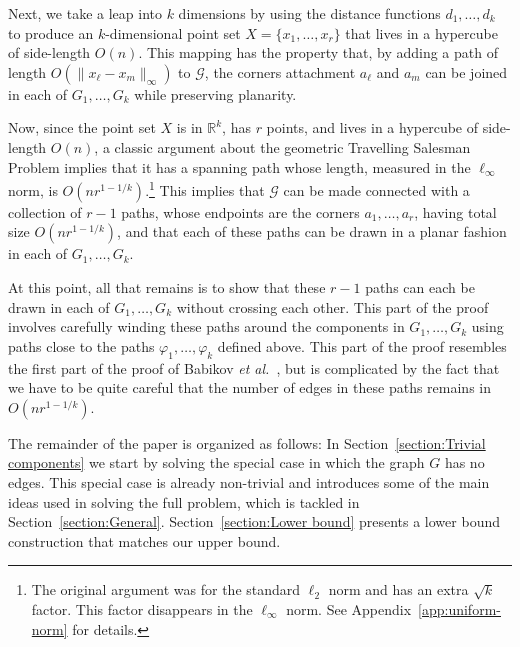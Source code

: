\documentclass[11pt]{patmorin}
\newcommand{\etal}{\emph{et al.}}
\newcommand{\R}{\mathbb{R}}
\begin{document}
Next, we take a leap into $k$ dimensions by using the distance
functions $d_1,\ldots,d_k$ to produce an $k$-dimensional point set
$X=\{x_1,\ldots,x_r\}$ that lives in a hypercube of side-length $O(n)$.
This mapping has the property that, by adding a path of length $O(\|x_\ell
-x_m\|_\infty)$ to $\mathcal G$, the corners attachment $a_\ell$ and $a_m$
can be joined in each of $G_1,\ldots,G_k$ while preserving planarity.

Now, since the point set $X$ is in $\R^k$, has $r$ points, and lives in a
hypercube of side-length $O(n)$, a classic argument about the geometric
Travelling Salesman Problem \cite{few:shortest,moran:on} implies that it has a
spanning path whose length, measured in the $\ell_\infty$ norm, is
$O(nr^{1-1/k})$.\footnote{The original argument was for the standard
$\ell_2$ norm and has an extra $\sqrt{k}$ factor.  This factor disappears
in the $\ell_\infty$ norm.  See Appendix~\ref{app:uniform-norm} for details.}
This implies that $\mathcal G$ can be made connected with a collection
of $r-1$ paths, whose endpoints are the corners $a_1,\ldots,a_r$, having
total size $O(nr^{1-1/k})$, and that each of these paths can be
drawn in a planar fashion in each of $G_1,\ldots,G_k$.

At this point, all that remains is to show that these $r-1$ paths
can each be drawn in each of $G_1,\ldots,G_k$ without crossing
each other.  This part of the proof involves carefully winding these
paths around the components in $G_1,\ldots,G_k$ using paths close
to the paths $\varphi_1,\ldots,\varphi_k$ defined above. This part
of the proof resembles the first part of the proof of Babikov \etal\
\cite{babikov.souvaine.ea:constructing}, but is complicated by the fact
that we have to be quite careful that the number of edges in these paths
remains in $O(nr^{1-1/k})$. 


The remainder of the paper is organized as follows: In
Section~\ref{section:Trivial components} we start by solving
the special case in which the graph $G$ has no edges. This
special case is already non-trivial and introduces some of the
main ideas used in solving the full problem, which is tackled in
Section~\ref{section:General}. Section~\ref{section:Lower bound}
presents a lower bound construction that matches our upper bound.
\end{document}
